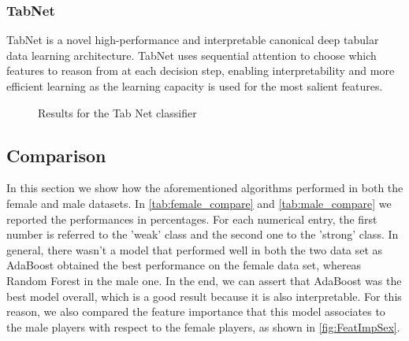 \subsubsection{TabNet}
TabNet \cite{arik2020tabnet} is a novel high-performance and interpretable canonical deep tabular data learning architecture. TabNet uses sequential attention to choose which features to reason from at each decision step, enabling interpretability and more efficient learning as the learning capacity is used for the most salient features.
\begin{figure}[H]
    \centering
    \caption{Results for the Tab Net classifier}
    \label{fig:TNResults}
\end{figure}

\subsection{Comparison} \label{subsect:comparison}
In this section we show how the aforementioned algorithms performed in both the female and male datasets. In \autoref{tab:female_compare} and \autoref{tab:male_compare} we reported the performances in percentages. For each numerical entry, the first number is referred to the 'weak' class and the second one to the 'strong' class. In general, there wasn't a model that performed well in both the two data set as AdaBoost obtained the best performance on the female data set, whereas Random Forest in the male one. In the end, we can assert that AdaBoost was the best model overall, which is a good result because it is also interpretable. For this reason, we also compared the feature importance that this model associates to the male players with respect to the female players, as shown in \autoref{fig:FeatImpSex}.

